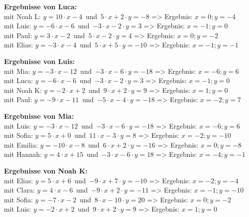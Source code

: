 \begin{minipage}{\textwidth}
\textbf{Ergebnisse von Luca:}\\
mit Noah L: $y=10\cdot x-4$\mbox{ }und\mbox{ }$5\cdot x+2\cdot y=-8$ => Ergebnis: $x=0;y=-4$
\\
mit Luis: $y=-6\cdot x-6$\mbox{ }und\mbox{ }$-3\cdot x-2\cdot y=3$ => Ergebnis: $x=-1;y=0$
\\
mit Paul: $y=3\cdot x-2$\mbox{ }und\mbox{ }$5\cdot x-2\cdot y=4$ => Ergebnis: $x=0;y=-2$
\\
mit Elias: $y=-3\cdot x-4$\mbox{ }und\mbox{ }$5\cdot x+5\cdot y=-10$ => Ergebnis: $x=-1;y=-1$
\\
\end{minipage}
\vspace*{3ex}

\begin{minipage}{\textwidth}
\textbf{Ergebnisse von Luis:}\\
mit Mia: $y=-3\cdot x-12$\mbox{ }und\mbox{ }$-3\cdot x-6\cdot y=-18$ => Ergebnis: $x=-6;y=6$
\\
mit Luca: $y=-6\cdot x-6$\mbox{ }und\mbox{ }$-3\cdot x-2\cdot y=3$ => Ergebnis: $x=-1;y=0$
\\
mit Noah K: $y=-2\cdot x+2$\mbox{ }und\mbox{ }$9\cdot x+2\cdot y=9$ => Ergebnis: $x=1;y=0$
\\
mit Paul: $y=-9\cdot x-11$\mbox{ }und\mbox{ }$-5\cdot x-4\cdot y=-18$ => Ergebnis: $x=-2;y=7$
\\
\end{minipage}
\vspace*{3ex}

\begin{minipage}{\textwidth}
\textbf{Ergebnisse von Mia:}\\
mit Luis: $y=-3\cdot x-12$\mbox{ }und\mbox{ }$-3\cdot x-6\cdot y=-18$ => Ergebnis: $x=-6;y=6$
\\
mit Sofia: $y=5\cdot x+0$\mbox{ }und\mbox{ }$11\cdot x-3\cdot y=8$ => Ergebnis: $x=-2;y=-10$
\\
mit Emilia: $y=-10\cdot x-8$\mbox{ }und\mbox{ }$6\cdot x+2\cdot y=-16$ => Ergebnis: $x=0;y=-8$
\\
mit Hannah: $y=4\cdot x+15$\mbox{ }und\mbox{ }$-3\cdot x-6\cdot y=18$ => Ergebnis: $x=-4;y=-1$
\\
\end{minipage}
\vspace*{3ex}

\begin{minipage}{\textwidth}
\textbf{Ergebnisse von Noah K:}\\
mit Elias: $y=5\cdot x+6$\mbox{ }und\mbox{ }$-9\cdot x+7\cdot y=-10$ => Ergebnis: $x=-2;y=-4$
\\
mit Clara: $y=4\cdot x-6$\mbox{ }und\mbox{ }$-9\cdot x+2\cdot y=-11$ => Ergebnis: $x=-1;y=-10$
\\
mit Sofia: $y=-7\cdot x-2$\mbox{ }und\mbox{ }$8\cdot x-10\cdot y=20$ => Ergebnis: $x=0;y=-2$
\\
mit Luis: $y=-2\cdot x+2$\mbox{ }und\mbox{ }$9\cdot x+2\cdot y=9$ => Ergebnis: $x=1;y=0$
\\
\end{minipage}
\vspace*{3ex}

